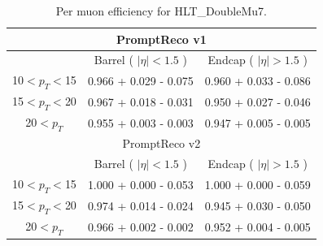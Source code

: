 \begin{table}[!ht]
\begin{center}
\begin{tabular}{c|c|c} 
\hline
\multicolumn{3}{c}{PromptReco v1}                                \\
\hline
              & Barrel ( $|\eta|<1.5$ )  & Endcap ( $|\eta|>1.5$ ) \\  
\hline
\hline
10$<p_{T}<$15 & 0.966 + 0.029 - 0.075  & 0.960 + 0.033 - 0.086     \\  \hline
15$<p_{T}<$20 & 0.967 + 0.018 - 0.031  & 0.950 + 0.027 - 0.046     \\  \hline
20$<p_{T}$   & 0.955 + 0.003 - 0.003  & 0.947 + 0.005 - 0.005      \\
\hline
\hline
\multicolumn{3}{c}{PromptReco v2}                                \\
\hline
              & Barrel ( $|\eta|<1.5$ )  & Endcap ( $|\eta|>1.5$ ) \\  
\hline
\hline
10$<p_{T}<$15 & 1.000 + 0.000 - 0.053  & 1.000 + 0.000 - 0.059     \\  \hline
15$<p_{T}<$20 & 0.974 + 0.014 - 0.024  & 0.945 + 0.030 - 0.050     \\  \hline
20$<p_{T}$   & 0.966 + 0.002 - 0.002  & 0.952 + 0.004 - 0.005      \\
\hline
\end{tabular}
\caption{Per muon efficiency for HLT\_DoubleMu7.}
\label{tab:eff_double_mu}
\end{center}
\end{table}



